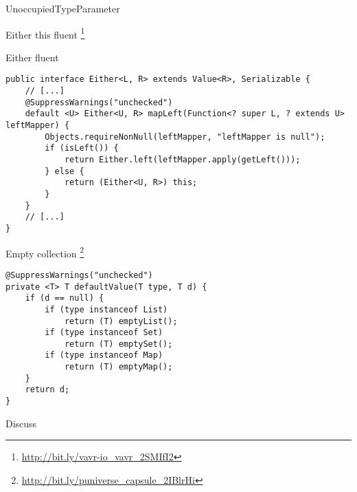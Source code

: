 \begin{pattern}{UnoccupiedTypeParameter}

\instances{}

Either this fluent \api{}
\footnote{\url{http://bit.ly/vavr-io_vavr_2SMIfI2}}

\begin{listing}[H]
\caption{Either fluent \api{}}
\begin{verbatim}
public interface Either<L, R> extends Value<R>, Serializable {
    // [...]
    @SuppressWarnings("unchecked")
    default <U> Either<U, R> mapLeft(Function<? super L, ? extends U> leftMapper) {
        Objects.requireNonNull(leftMapper, "leftMapper is null");
        if (isLeft()) {
            return Either.left(leftMapper.apply(getLeft()));
        } else {
            return (Either<U, R>) this;
        }
    }
    // [...]
}
\end{verbatim}
\end{listing}





Empty collection%
\footnote{\url{http://bit.ly/puniverse_capsule_2IBlrHi}}

\begin{verbatim}
@SuppressWarnings("unchecked")
private <T> T defaultValue(T type, T d) {
    if (d == null) {
        if (type instanceof List)
            return (T) emptyList();
        if (type instanceof Set)
            return (T) emptySet();
        if (type instanceof Map)
            return (T) emptyMap();
    }
    return d;
}
\end{verbatim}

\detection{}

\discussion{}

Discuss

\related{}

\end{pattern}
